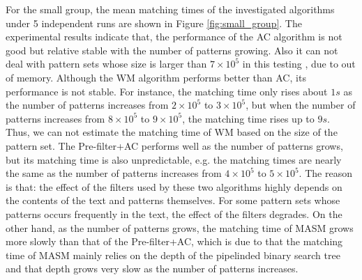 \documentclass{article}
\begin{document}
For the small group, the mean matching times of the investigated
algorithms under 5 independent runs are shown in Figure
\ref{fig:small_group}. The experimental results indicate that, the
performance of the \textsf{AC} algorithm is not good but relative
stable with the number of patterns growing. Also it can not deal with
pattern sets whose size is larger than $7 \times 10^5$ in this testing
, due to out of memory. Although the \textsf{WM} algorithm performs
better than \textsf{AC}, its performance is not stable. For instance,
the matching time only rises about $1s$ as the number of patterns
increases from $2 \times 10^5$ to $3 \times 10^5$, but when the number
of patterns increases from $8 \times 10^5$ to $9 \times 10^5$, the
matching time rises up to $9s$. Thus, we can not estimate the matching
time of \textsf{WM} based on the size of the pattern set. The
\textsf{Pre-filter+AC} performs well as the number of patterns grows,
but its matching time is also unpredictable, e.g. the matching times
are nearly the same as the number of patterns increases from
$4 \times 10^5$ to $5 \times 10^5$. The reason is that: the effect of
the filters used by these two algorithms highly depends on the
contents of the text and patterns themselves. For some pattern sets
whose patterns occurs frequently in the text, the effect of the
filters degrades. On the other hand, as the number of patterns grows,
the matching time of \textsf{MASM} grows more slowly than that of the
\textsf{Pre-filter+AC}, which is due to that the matching time of
\textsf{MASM} mainly relies on the depth of the pipelinded binary
search tree and that depth grows very slow as the number of patterns
increases.
\end{document}
